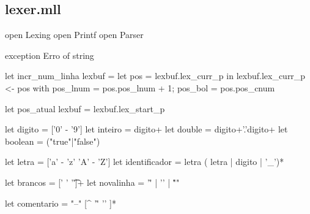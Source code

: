 \documentclass[12pt,a4paper,twoside]{report}
\begin{document}
\subsection{lexer.mll}
\begin{terminal}
{
  open Lexing
  open Printf
  open Parser

  exception Erro of string

  let incr_num_linha lexbuf = 
    let pos = lexbuf.lex_curr_p in
    lexbuf.lex_curr_p <-
      { pos with pos_lnum = pos.pos_lnum + 1;
                 pos_bol = pos.pos_cnum
      }

    let pos_atual lexbuf = lexbuf.lex_start_p

}

let digito = ['0' - '9']
let inteiro = digito+
let double = digito+'.'digito+
let boolean = ("true"|"false")

let letra = ['a' - 'z' 'A' - 'Z']
let identificador = letra ( letra | digito | '_')*

let brancos = [' ' '\t']+
let novalinha = '\r' | '\n' | "\r\n"

let comentario = "--" [^ '\r' '\n' ]*


\end{terminal}
\end{document}
